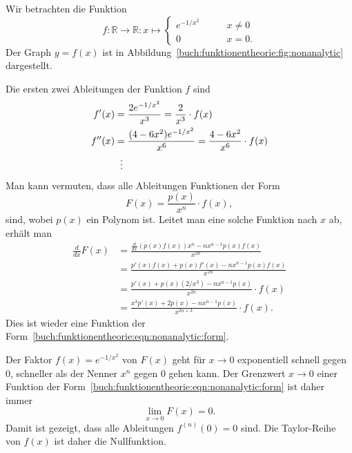 \begin{beispiel}
\label{buch:funktionentheorie:beispiel:nichtanalytisch}
Wir betrachten die Funktion
\[
f\colon \mathbb{R}\to\mathbb{R}
:
x \mapsto
\begin{cases}
e^{-1/x^2}&\qquad x\ne 0\\
0&\qquad x=0.
\end{cases}
\]
Der Graph $y=f(x)$ ist in Abbildung~\ref{buch:funktionentheorie:fig:nonanalytic}
dargestellt.

Die ersten zwei Ableitungen der Funktion $f$ sind
\begin{align*}
f'(x) &= \frac{2e^{-1/x^2}}{x^3} = \frac{2}{x^3}\cdot f(x)
\\
f''(x) &= \frac{(4-6x^2) e^{-1/x^2}}{x^6} = \frac{4-6x^2}{x^6}\cdot f(x)
\\
&\hspace*{2mm}\vdots
\end{align*}
Man kann vermuten, dass alle
Ableitungen Funktionen der Form
\begin{equation}
F(x) = \frac{p(x)}{x^n} \cdot f(x),
\label{buch:funktionentheorie:eqn:nonanalytic:form}
\end{equation}
sind,
wobei $p(x)$ ein Polynom ist.
Leitet man eine solche Funktion nach $x$ ab, erhält man
\begin{align*}
\frac{d}{dx} F(x)
&=
\frac{\frac{d}{dx}(p(x)f(x)) x^n - nx^{n-1}p(x)f(x)}{x^{2n}}
\\
&=
\frac{p'(x)f(x) + p(x)f'(x) - nx^{n-1}p(x)f(x)}{x^{2n}} 
\\
&=
\frac{p'(x) + p(x)(2/x^3) - nx^{n-1}p(x)}{x^{2n}} \cdot f(x)
\\
&=
\frac{x^3p'(x)+2p(x)-nx^{n-1}p(x)}{x^{2n+3}}\cdot f(x).
\end{align*}
Dies ist wieder eine Funktion der
Form~\eqref{buch:funktionentheorie:eqn:nonanalytic:form}.

Der Faktor $f(x)=e^{-1/x^2}$ von $F(x)$ geht für $x\to 0$ exponentiell
schnell gegen $0$, schneller als der Nenner $x^n$ gegen $0$ gehen
kann. 
Der Grenzwert $x\to 0$ einer Funktion der 
Form~\eqref{buch:funktionentheorie:eqn:nonanalytic:form}
ist daher immer
\[
\lim_{x\to 0}  F(x) =0.
\]
Damit ist gezeigt, dass alle Ableitungen $f^{(n)}(0)=0$ sind.
Die Taylor-Reihe von $f(x)$ ist daher die Nullfunktion.
\end{beispiel}

%

